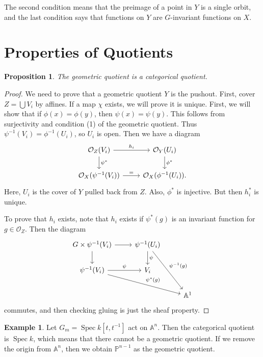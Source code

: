 \documentclass[leqno, openany]{memoir}
\newtheorem{prop}[thm]{Proposition}
\theoremstyle{definition}
\newtheorem{exm}[thm]{Example}
\theoremstyle{remark}
\theoremstyle{plain}
\theoremstyle{definition}
\theoremstyle{remark}
\newcommand{\A}{\mathbb{A}}
\renewcommand{\P}{\mathbb{P}}
\newcommand{\mc}[1]{\mathcal{#1}}
\DeclareMathOperator{\Spec}{Spec}
\begin{document}
The second condition means that the preimage of a point in $Y$ is a single
orbit, and the last condition says that functions on $Y$ are $G$-invariant
functions on $X$.

\section{Properties of Quotients}%

\begin{prop} The geometric quotient is a categorical quotient.  \end{prop}

\begin{proof} We need to prove that a geometric quotient $Y$ is the pushout.
    First, cover $Z = \bigcup V_i$ by affines. If a map $\chi$ exists, we will
    prove it is unique. First, we will show that if $\phi(x) = \phi(y)$, then
    $\psi(x) = \psi(y)$. This follows from surjectivity and condition (1) of
    the geometric quotient. Thus $\psi^{-1}(V_i) = \phi^{-1}(U_i)$, so $U_i$ is
    open. Then we have a diagram \begin{equation} \begin{tikzcd} \mc{O}_Z(V_i)
    \arrow{r}{h_i} \arrow{d}{\psi^*} & \mc{O}_Y(U_i) \arrow{d}{\phi^*} \\
\mc{O}_X(\psi^{-1}(V_i)) \arrow{r}{=} & \mc{O}_X(\phi^{-1}(U_i)).  \end{tikzcd}
\end{equation} Here, $U_i$ is the cover of $Y$ pulled back from $Z$. Also,
$\phi^*$ is injective. But then $h_i^*$ is unique.

    To prove that $h_i$ exists, note that $h_i$ exists if $\psi^*(g)$ is an
    invariant function for $g \in \mc{O}_Z$. Then the diagram \begin{equation}
        \begin{tikzcd} G \times \psi^{-1}(V_i) \arrow{r} \arrow{d} &
            \psi^{-1}(U_i) \arrow{d}{\psi} \arrow{ddr}{\psi^{-1}(g)} \\
        \psi^{-1}(V_i) \arrow{r}{\psi} \arrow{drr}{\psi^*(g)} & V_i \\ & & \A^1
    \end{tikzcd} \end{equation} commutes, and then checking gluing is just the
sheaf property.  \end{proof}

\begin{exm} Let $G_m = \Spec k[t,t^{-1}]$ act on $\A^n$. Then the categorical
    quotient is $\Spec k$, which means that there cannot be a geometric
    quotient. If we remove the origin from $\A^n$, then we obtain $\P^{n-1}$ as
    the geometric quotient.  \end{exm}
\end{document}
